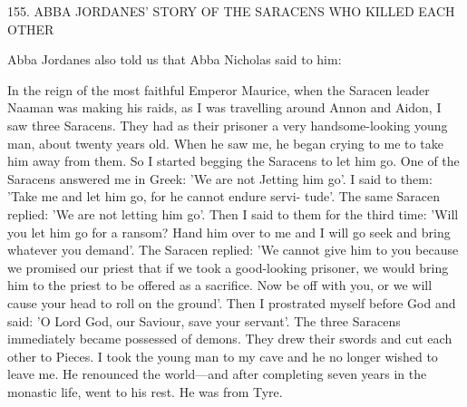 155.
ABBA JORDANES' STORY OF THE
SARACENS WHO KILLED EACH OTHER

Abba Jordanes also told us that Abba Nicholas said to him:

In the reign of the most faithful Emperor Maurice, when the
Saracen leader Naaman was making his raids, as I was travelling
around Annon and Aidon, I saw three Saracens.
They had as their
prisoner a very handsome-looking young man, about twenty years
old.
When he saw me, he began crying to me to take him away
from them.
So I started begging the Saracens to let him go.
One of
the Saracens answered me in Greek: 'We are not Jetting him go'.
I
said to them: 'Take me and let him go, for he cannot endure servi-
tude'.
The same Saracen replied: 'We are not letting him go'.
Then
I said to them for the third time: 'Will you let him go for a ransom?
Hand him over to me and I will go seek and bring whatever you
demand'.
The Saracen replied: 'We cannot give him to you because
we promised our priest that if we took a good-looking prisoner, we
would bring him to the priest to be offered as a sacrifice.
Now be
off with you, or we will cause your head to roll on the ground'.
Then I prostrated myself before God and said: 'O Lord God, our
Saviour, save your servant'.
The three Saracens immediately became
possessed of demons.
They drew their swords and cut each other to
Pieces.
I took the young man to my cave and he no longer wished
to leave me.
He renounced the world—and after completing seven
years in the monastic life, went to his rest.
He was from Tyre.

